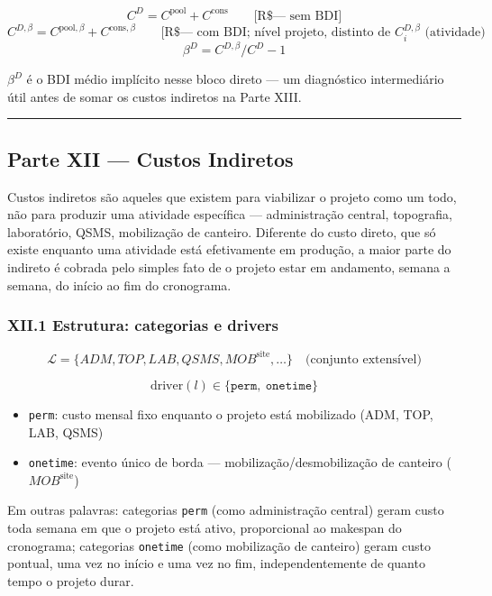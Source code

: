 \documentclass[
  10pt,
]{article}
\providecommand{\tightlist}{%
  \setlength{\itemsep}{0pt}\setlength{\parskip}{0pt}}
\begin{document}
\[C^D = C^{\mathrm{pool}}+C^{\mathrm{cons}}\qquad\text{[R\$ — sem BDI]}\]
\[C^{D,\beta} = C^{\mathrm{pool},\beta}+C^{\mathrm{cons},\beta}\qquad\text{[R\$ — com BDI; nível projeto, distinto de }C_i^{D,\beta}\text{ (atividade)}\]
\[\beta^D = C^{D,\beta}/C^D-1\]

\(\beta^D\) é o BDI médio implícito nesse bloco direto --- um
diagnóstico intermediário útil antes de somar os custos indiretos na
Parte XIII.

\begin{center}\rule{0.5\linewidth}{0.5pt}\end{center}

\hypertarget{parte-xii-custos-indiretos}{%
\subsection{Parte XII --- Custos
Indiretos}\label{parte-xii-custos-indiretos}}

Custos indiretos são aqueles que existem para viabilizar o projeto como
um todo, não para produzir uma atividade específica --- administração
central, topografia, laboratório, QSMS, mobilização de canteiro.
Diferente do custo direto, que só existe enquanto uma atividade está
efetivamente em produção, a maior parte do indireto é cobrada pelo
simples fato de o projeto estar em andamento, semana a semana, do início
ao fim do cronograma.

\hypertarget{xii.1-estrutura-categorias-e-drivers}{%
\subsubsection{XII.1 Estrutura: categorias e
drivers}\label{xii.1-estrutura-categorias-e-drivers}}

\[\mathcal{L} = \{ADM, TOP, LAB, QSMS, MOB^{\text{site}}, \ldots\}\quad\text{(conjunto extensível)}\]

\[\text{driver}(l)\in\{\texttt{perm},\ \texttt{onetime}\}\]

\begin{itemize}
\tightlist
\item
  \texttt{perm}: custo mensal fixo enquanto o projeto está mobilizado
  (ADM, TOP, LAB, QSMS)
\item
  \texttt{onetime}: evento único de borda --- mobilização/desmobilização
  de canteiro (\(MOB^{\text{site}}\))
\end{itemize}

Em outras palavras: categorias \texttt{perm} (como administração
central) geram custo toda semana em que o projeto está ativo,
proporcional ao makespan do cronograma; categorias \texttt{onetime}
(como mobilização de canteiro) geram custo pontual, uma vez no início e
uma vez no fim, independentemente de quanto tempo o projeto durar.
\end{document}
